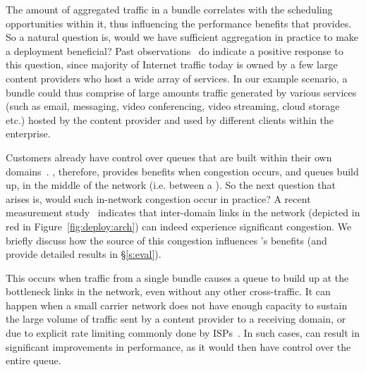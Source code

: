  The amount of aggregated traffic in a bundle correlates with the scheduling opportunities within it, thus influencing the performance benefits that \name provides. So a natural question is, would we have sufficient aggregation in practice to make a \name deployment beneficial? Past observations~\cite{fivecomps, labovitz} do indicate a positive response to this question, since majority of Internet traffic today is owned by a few large content providers who host a wide array of services. In our example scenario, a bundle could thus comprise of large amounts traffic generated by various services (such as email, messaging, video conferencing, video streaming, cloud storage etc.) hosted by the content provider and used by different clients within the enterprise.




Customers already have control over queues that are built within their own domains~\cite{swan, b4, bwe}. \name, therefore, provides benefits when congestion occurs, and queues build up, in the middle of the network (i.e. between a \pair).  
So the next question that arises is, would such in-network congestion occur in practice? A recent measurement study~\cite{inferring-interdomain-congestion} indicates that inter-domain links in the network (depicted in red in Figure~\ref{fig:deploy:arch}) can indeed experience significant congestion. We briefly discuss how the source of this congestion influences \name's benefits (and provide detailed results in \S\ref{s:eval}).

 This occurs when traffic from a single bundle causes a queue to build up at the bottleneck links in the network, even without any other cross-traffic. It can happen when a small carrier network does not have enough capacity to sustain the large volume of traffic sent by a content provider to a receiving domain, or due to explicit rate limiting commonly done by ISPs~\cite{isp-throttle-1, isp-throttle-2, isp-throttle-3}.  In such cases, \name can result in significant improvements in performance, as it would then have control over the entire queue. 


